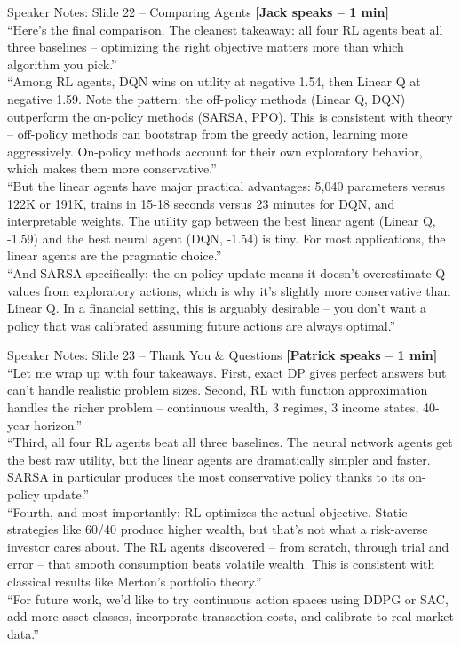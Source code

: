 \documentclass[aspectratio=169, 11pt]{beamer}
\begin{document}
\begin{frame}[allowframebreaks]{Speaker Notes: Slide 22 -- Comparing Agents}
\textbf{[Jack speaks -- 1 min]}\\
``Here's the final comparison. The cleanest takeaway: all four RL agents beat all three baselines -- optimizing the right objective matters more than which algorithm you pick.''\\[0.5em]
``Among RL agents, DQN wins on utility at negative 1.54, then Linear Q at negative 1.59. Note the pattern: the off-policy methods (Linear Q, DQN) outperform the on-policy methods (SARSA, PPO). This is consistent with theory -- off-policy methods can bootstrap from the greedy action, learning more aggressively. On-policy methods account for their own exploratory behavior, which makes them more conservative.''\\[0.5em]
``But the linear agents have major practical advantages: 5,040 parameters versus 122K or 191K, trains in 15-18 seconds versus 23 minutes for DQN, and interpretable weights. The utility gap between the best linear agent (Linear Q, -1.59) and the best neural agent (DQN, -1.54) is tiny. For most applications, the linear agents are the pragmatic choice.''\\[0.5em]
``And SARSA specifically: the on-policy update means it doesn't overestimate Q-values from exploratory actions, which is why it's slightly more conservative than Linear Q. In a financial setting, this is arguably desirable -- you don't want a policy that was calibrated assuming future actions are always optimal.''
\end{frame}

\begin{frame}[allowframebreaks]{Speaker Notes: Slide 23 -- Thank You \& Questions}
\textbf{[Patrick speaks -- 1 min]}\\
``Let me wrap up with four takeaways. First, exact DP gives perfect answers but can't handle realistic problem sizes. Second, RL with function approximation handles the richer problem -- continuous wealth, 3 regimes, 3 income states, 40-year horizon.''\\[0.5em]
``Third, all four RL agents beat all three baselines. The neural network agents get the best raw utility, but the linear agents are dramatically simpler and faster. SARSA in particular produces the most conservative policy thanks to its on-policy update.''\\[0.5em]
``Fourth, and most importantly: RL optimizes the actual objective. Static strategies like 60/40 produce higher wealth, but that's not what a risk-averse investor cares about. The RL agents discovered -- from scratch, through trial and error -- that smooth consumption beats volatile wealth. This is consistent with classical results like Merton's portfolio theory.''\\[0.5em]
``For future work, we'd like to try continuous action spaces using DDPG or SAC, add more asset classes, incorporate transaction costs, and calibrate to real market data.''
\end{frame}
\end{document}
